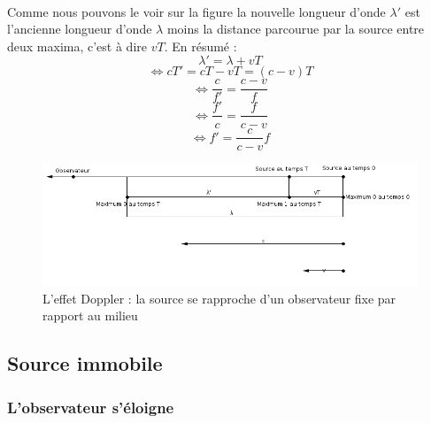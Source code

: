 \documentclass[a4paper]{article}
\begin{document}
\paragraph{}Comme nous pouvons le voir sur la figure la nouvelle longueur d'onde $\lambda'$ est l'ancienne longueur d'onde $\lambda$ moins la distance parcourue par la source entre deux maxima, c'est à dire $vT$. En résumé :
\[\lambda'=\lambda+vT\]
\[\Leftrightarrow cT'=cT-vT=(c-v)T\]
\[\Leftrightarrow \frac{c}{f'}=\frac{c-v}{f}\]
\[\Leftrightarrow \frac{f'}{c}=\frac{f}{c-v}\]
\[\Leftrightarrow f'=\frac{c}{c-v}f\]
\begin{figure}
\begin{center}
\includegraphics[width=15cm]{imgs/OfSa.png}
\end{center}
\caption{L'effet Doppler : la source se rapproche d'un observateur fixe par rapport au milieu}
\label{L'effet Doppler : la source se rapproche d'un observateur fixe par rapport au milieu}
\end{figure}
\subsection{Source immobile}
\subsubsection{L'observateur s'éloigne}
\end{document}
